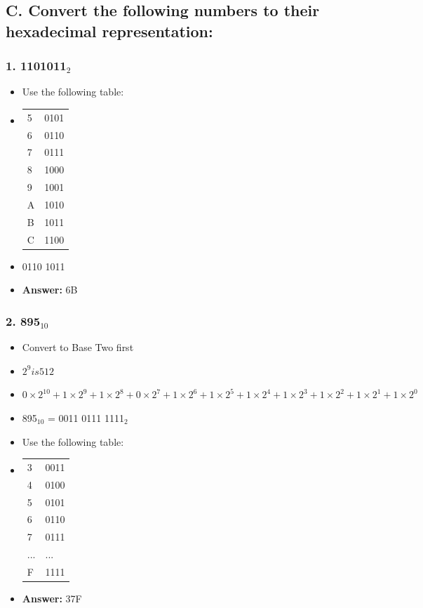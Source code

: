 \documentclass[11pt, oneside]{article}
\begin{document}
\subsection*{C. Convert the following numbers to their hexadecimal representation:}

\subsubsection*{1. 1101011$_{2}$}

\begin{itemize}
    \item Use the following table:
    \item
        \begin{tabular}{ |p{1.5cm}|p{1.5cm}|  }
            \hline
            5 & 0101 \\
            6 & 0110 \\
            7 & 0111 \\
            8 & 1000 \\
            9 & 1001 \\
            A & 1010 \\
            B & 1011 \\
            C & 1100 \\
            \hline
        \end{tabular}
    \item 0110 1011
    \item \textbf{Answer:} 6B
\end{itemize}

\subsubsection*{2. 895$_{10}$}

\begin{itemize}
    \item Convert to Base Two first
    \item \(2^9 is 512\)
    \item \(0\times2^10 + 1\times2^9 + 1\times2^8 + 0\times2^7 + 1\times2^6 + 1\times2^5 + 1\times2^4 + 1\times2^3 + 1\times2^2 + 1\times2^1 + 1\times2^0\)
    \item 895$_{10}$ = 0011 0111 1111$_{2}$
    \item Use the following table:
    \item
        \begin{tabular}{ |p{1.5cm}|p{1.5cm}|  }
            \hline
            3 & 0011 \\
            4 & 0100 \\
            5 & 0101 \\
            6 & 0110 \\
            7 & 0111 \\
            ... & ... \\
            F & 1111 \\
            \hline
        \end{tabular}
    \item \textbf{Answer:} 37F
\end{itemize}
\end{document}
